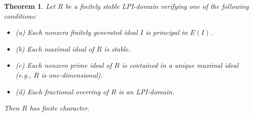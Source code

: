 \documentclass[12pt]{amsart}
\newtheorem{theorem}{Theorem}
\theoremstyle{definition}
\begin{document}
\begin{theorem} \label{LPI-FC} 
Let $R$ be a finitely stable LPI-domain verifying one of the following conditions:
\begin {itemize}
 
\item[(a)] Each nonzero finitely generated  ideal $I$ is principal in $E(I)$.

\item[(b)] Each maximal ideal of $R$ is stable.

\item[(c)] \cite[Lemma 3.9]{O3} Each nonzero prime ideal of $R$ is contained in a unique maximal ideal (e.g., $R$ is one-dimensional).

\item[(d)] Each fractional overring of $R$ is an LPI-domain.
\end{itemize}
Then $R$ has finite character.
\end{theorem}
\end{document}
